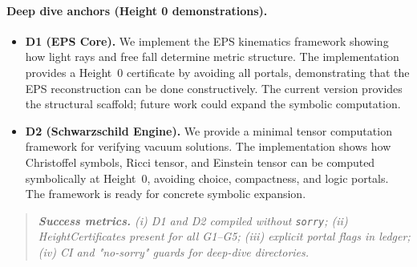 \documentclass[11pt]{article}
\newenvironment{mdframed}[1][]{\begin{quote}\itshape}{\end{quote}}
\theoremstyle{definition}
\theoremstyle{remark}
\begin{document}
\paragraph{Deep dive anchors (Height 0 demonstrations).}
\begin{itemize}
\item \textbf{D1 (EPS Core).} We implement the EPS kinematics framework showing how light rays and free fall determine metric structure. The implementation provides a Height~0 certificate by avoiding all portals, demonstrating that the EPS reconstruction can be done constructively. The current version provides the structural scaffold; future work could expand the symbolic computation.
\item \textbf{D2 (Schwarzschild Engine).} We provide a minimal tensor computation framework for verifying vacuum solutions. The implementation shows how Christoffel symbols, Ricci tensor, and Einstein tensor can be computed symbolically at Height~0, avoiding choice, compactness, and logic portals. The framework is ready for concrete symbolic expansion.
\end{itemize}

\begin{mdframed}[style=status]
\textbf{Success metrics.} (i) D1 and D2 compiled without \texttt{sorry}; (ii) HeightCertificates present for all G1--G5; (iii) explicit portal flags in ledger; (iv) CI and "no-sorry" guards for deep-dive directories.
\end{mdframed}
\end{document}

